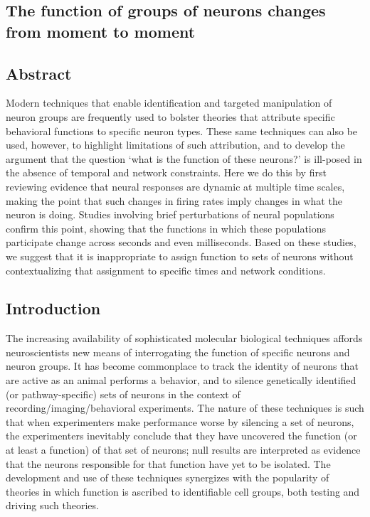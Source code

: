 \begin{refsection}

\chapter[Dynamic function of neurons]{The function of groups of neurons changes from moment to moment}

\section{Abstract}
Modern techniques that enable identification and targeted manipulation of neuron groups are frequently used to bolster theories that attribute specific behavioral functions to specific neuron types. These same techniques can also be used, however, to highlight limitations of such attribution, and to develop the argument that the question ‘what is the function of these neurons?’ is ill-posed in the absence of temporal and network constraints. Here we do this by first reviewing evidence that neural responses are dynamic at multiple time scales, making the point that such changes in firing rates imply changes in what the neuron is doing. Studies involving brief perturbations of neural populations confirm this point, showing that the functions in which these populations participate change across seconds and even milliseconds. Based on these studies, we suggest that it is inappropriate to assign function to sets of neurons without contextualizing that assignment to specific times and network conditions.

\section{Introduction}
The increasing availability of sophisticated molecular biological techniques affords neuroscientists new means of interrogating the function of specific neurons and neuron groups. It has become commonplace to track the identity of neurons that are active as an animal performs a behavior, and to silence genetically identified (or pathway-specific) sets of neurons in the context of recording/imaging/behavioral experiments. The nature of these techniques is such that when experimenters make performance worse by silencing a set of neurons, the experimenters inevitably conclude that they have uncovered the function (or at least a function) of that set of neurons; null results are interpreted as evidence that the neurons responsible for that function have yet to be isolated. The development and use of these techniques synergizes with the popularity of theories in which function is ascribed to identifiable cell groups, both testing and driving such theories.


\end{refsection}
